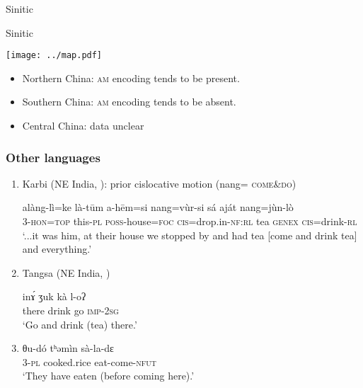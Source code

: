 \documentclass[xcolor=table]{beamer}
\newcommand{\rouge}[1]{{\color{red}#1}}
\begin{document}
\begin{frame}{Sinitic}
\end{frame}

\begin{frame}{Sinitic}
 \begin{minipage}[c]{.46\linewidth}
\texttt{[image: ../map.pdf]} 
   \end{minipage} \hfill
   \begin{minipage}[c]{.46\linewidth}
   
   \begin{itemize}
\item Northern China: \textsc{am} encoding tends to be present.
\item Southern China: \textsc{am} encoding tends to be absent.
\item Central China: data unclear
\end{itemize}
\end{minipage}
\end{frame}


\begin{frame} 
\frametitle{Other languages}
\begin{enumerate}
\item<1-> Karbi (NE India, \citealt{konnerth15cisloc}): prior cislocative motion (\rouge{nang}= \textsc{come\&do})
\begin{exe}
\ex 
\gll alàng-lì=ke là-tūm a-hēm=si \rouge{nang}=vùr-si sá aját \rouge{nang}=jùn-lò \\
 3-\textsc{hon}=\textsc{top} this-\textsc{pl} \textsc{poss}-house=\textsc{foc} \rouge{\textsc{cis}}=drop.in-\textsc{nf}:\textsc{rl} tea \textsc{genex} \rouge{\textsc{cis}}=drink-\textsc{rl} \\
 \glt `...it was him, at their house we stopped by and had tea [\rouge{come} and drink tea] and everything.'
\end{exe}
 \item<2-> Tangsa (NE India, \citealt[311-312]{boro17hakhun})
 \begin{exe}
\ex 
\gll   inɤ́ ʒuk \rouge{kà} l-oʔ \\
there drink \rouge{go} \textsc{imp}-\textsc{2sg} \\
\glt ‘\rouge{Go} and drink (tea) there.’
\end{exe}
  \item<3->   \citet[388]{Jenny16grammar}
 \begin{exe}
\ex 
\gll   θu-dó tʰəmìn sà-\rouge{la}-dɛ \\
3-\textsc{pl} cooked.rice eat-\rouge{come}-\textsc{nfut}  \\
\glt ‘They have eaten (\rouge{before coming here}).'
\end{exe}
   \end{enumerate}
\end{frame}  
\end{document}
